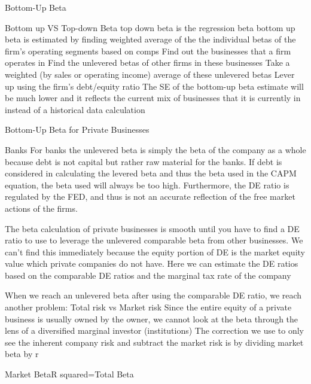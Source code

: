 \documentclass[10pt]{article}
\begin{document}
      \begin{core}{Bottom-Up Beta}

        Bottom up VS Top-down Beta
        top down beta is the regression beta
        bottom up beta is estimated by finding weighted average of the the individual betas of the firm’s operating segments based on comps 
        Find out the businesses that a firm operates in
        Find the unlevered betas of other firms in these businesses
        Take a weighted (by sales or operating income) average of these unlevered betas
        Lever up using the firm’s debt/equity ratio
        The SE of the bottom-up beta estimate will be much lower and it reflects the current mix of businesses that it is currently in instead of a historical data calculation

      \end{core}

      \begin{core}{Bottom-Up Beta for Private Businesses}

        Banks
        For banks the unlevered beta is simply the beta of the company as a whole because debt is not capital but rather raw material for the banks. If debt is considered in calculating the levered beta and thus the beta used in the CAPM equation, the beta used will always be too high.
        Furthermore, the DE ratio is regulated by the FED, and thus is not an accurate reflection of the free market actions of the firms.

        The beta calculation of private businesses is smooth until you have to find a DE ratio to use to leverage the unlevered comparable beta from other businesses. We can’t find this immediately because the equity portion of DE is the market equity value which private companies do not have.
        Here we can estimate the DE ratios based on the comparable DE ratios and the marginal tax rate of the company

        When we reach an unlevered beta after using the comparable DE ratio, we reach another problem: Total risk vs Market risk
        Since the entire equity of a private business is usually owned by the owner, we cannot look at the beta through the lens of a diversified marginal investor (institutions)
        The correction we use to only see the inherent company risk and subtract the market risk is by dividing market beta by r

        Market BetaR squared=Total Beta

      \end{core}
\end{document}
